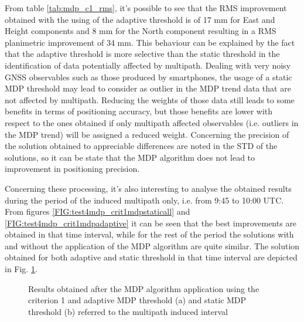 From table \ref{tab:mdp_c1_rms}, it's possible to see that the RMS improvement obtained with the using of the adaptive threshold is of 17 mm for East and Height components and 8 mm for the North component resulting in a RMS planimetric improvement of 34 mm. This behaviour can be explained by the fact that the adaptive threshold is more selective than the static threshold in the identification of data potentially affected by multipath. Dealing with very noisy GNSS observables such as those produced by smartphones, the usage of a static MDP threshold may lead to consider as outlier in the MDP trend data that are not affected by multipath. Reducing the weights of those data still leads to some benefits in terms of positioning accuracy, but those benefits are lower with respect to the ones obtained if only multipath affected observables (i.e. outliers in the MDP trend) will be assigned a reduced weight. Concerning the precision of the solution obtained to appreciable differences are noted in the STD of the solutions, so it can be state that the MDP algorithm does not lead to improvement in positioning precision.

Concerning these processing, it's also interesting to analyse the obtained results during the period of the induced multipath only, i.e. from 9:45 to 10:00 UTC. From figures \ref{FIG:test4mdp_crit1mdpstaticall} and \ref{FIG:test4mdp_crit1mdpadaptive} it can be seen that the best improvements are obtained in that time interval, while for the rest of the period the solutions with and without the application of the MDP algorithm are quite similar. The solution obtained for both adaptive and static threshold in that time interval are depicted in Fig. \ref{FIG:test4mdp_crit1mpind}.

\begin{figure}[H] 
	\centering
    \caption{Results obtained after the MDP algorithm application using the criterion 1 and adaptive MDP threshold (a) and static MDP threshold (b) referred to the multipath induced interval}
	\label{FIG:test4mdp_crit1mpind} 
\end{figure}

